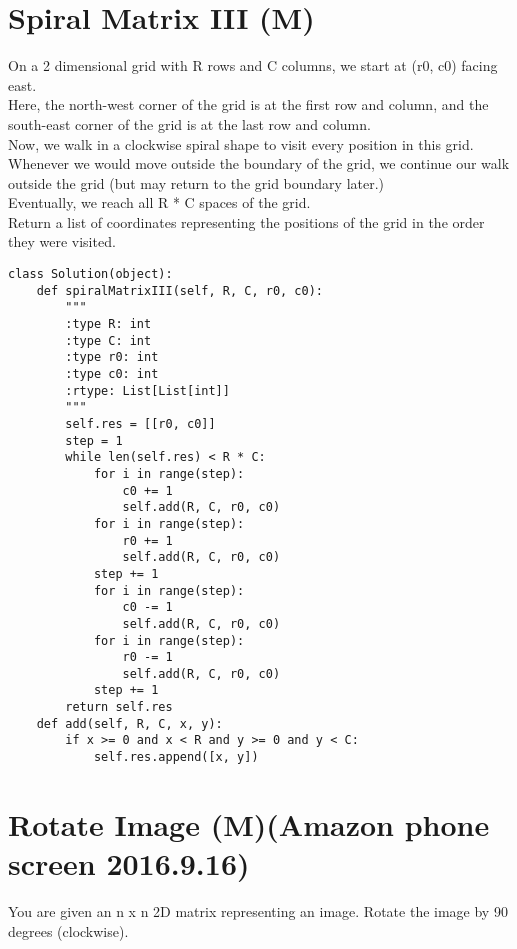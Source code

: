 \section{Spiral Matrix III (M)}
On a 2 dimensional grid with R rows and C columns, we start at (r0, c0) facing east.\\

Here, the north-west corner of the grid is at the first row and column, and the south-east corner of the grid is at the last row and column.\\

Now, we walk in a clockwise spiral shape to visit every position in this grid. \\

Whenever we would move outside the boundary of the grid, we continue our walk outside the grid (but may return to the grid boundary later.) \\

Eventually, we reach all R * C spaces of the grid.\\

Return a list of coordinates representing the positions of the grid in the order they were visited.\\

\begin{lstlisting}
class Solution(object):
    def spiralMatrixIII(self, R, C, r0, c0):
        """
        :type R: int
        :type C: int
        :type r0: int
        :type c0: int
        :rtype: List[List[int]]
        """
        self.res = [[r0, c0]]
        step = 1
        while len(self.res) < R * C:
            for i in range(step): 
                c0 += 1
                self.add(R, C, r0, c0)
            for i in range(step): 
                r0 += 1
                self.add(R, C, r0, c0)
            step += 1
            for i in range(step): 
                c0 -= 1
                self.add(R, C, r0, c0)
            for i in range(step): 
                r0 -= 1
                self.add(R, C, r0, c0)
            step += 1
        return self.res
    def add(self, R, C, x, y):
        if x >= 0 and x < R and y >= 0 and y < C:
            self.res.append([x, y])
\end{lstlisting}

\section{Rotate Image (M)(Amazon phone screen 2016.9.16)}
You are given an n x n 2D matrix representing an image. Rotate the image by 90 degrees (clockwise).\\

